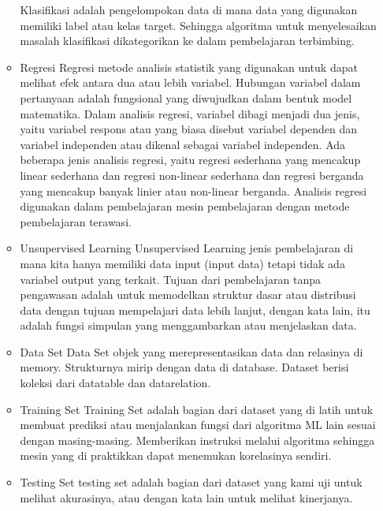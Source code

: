 \begin{enumerate}
\begin{itemize}
		\hfill\break
		Klasifikasi adalah pengelompokan data di mana data yang digunakan memiliki label atau kelas target. Sehingga algoritma untuk menyelesaikan masalah klasifikasi dikategorikan ke dalam pembelajaran terbimbing.
		\item Regresi
		\hfill\break
		Regresi metode analisis statistik yang digunakan untuk dapat melihat efek antara dua atau lebih variabel. Hubungan variabel dalam pertanyaan adalah fungsional yang diwujudkan dalam bentuk model matematika. Dalam analisis regresi, variabel dibagi menjadi dua jenis, yaitu variabel respons atau yang biasa disebut variabel dependen dan variabel independen atau dikenal sebagai variabel independen. Ada beberapa jenis analisis regresi, yaitu regresi sederhana yang mencakup linear sederhana dan regresi non-linear sederhana dan regresi berganda yang mencakup banyak linier atau non-linear berganda. Analisis regresi digunakan dalam pembelajaran mesin pembelajaran dengan metode pembelajaran terawasi.
		\item Unsupervised Learning 
		\hfill\break
		Unsupervised Learning jenis pembelajaran di mana kita hanya memiliki data input (input data) tetapi tidak ada variabel output yang terkait. Tujuan dari pembelajaran tanpa pengawasan adalah untuk memodelkan struktur dasar atau distribusi data dengan tujuan mempelajari data lebih lanjut, dengan kata lain, itu adalah fungsi simpulan yang menggambarkan atau menjelaskan data.
		\item Data Set
		\hfill\break
		Data Set objek yang merepresentasikan data dan relasinya di memory. Strukturnya mirip dengan data di database. Dataset berisi koleksi dari datatable dan datarelation.
		\item Training Set
		\hfill\break
		Training Set adalah bagian dari dataset yang di latih untuk membuat prediksi atau menjalankan fungsi dari algoritma ML lain sesuai dengan masing-masing. Memberikan instruksi melalui algoritma sehingga mesin yang di praktikkan dapat menemukan korelasinya sendiri.
		\item Testing Set
		\hfill\break
		testing set adalah bagian dari dataset yang kami uji untuk melihat akurasinya, atau dengan kata lain untuk melihat kinerjanya.
	\end{itemize}
\end{enumerate}
